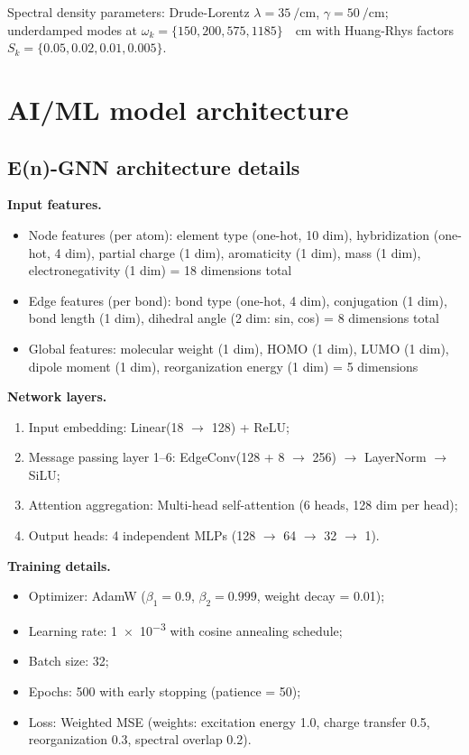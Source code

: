 \documentclass[11pt,a4paper]{article}
\begin{document}
Spectral density parameters: Drude-Lorentz $\lambda = \SI{35}{\per\centi\meter}$, $\gamma = \SI{50}{\per\centi\meter}$; underdamped modes at $\omega_k = \{\num{150}, \num{200}, \num{575}, \num{1185}\}$~\si{\per\centi\meter} with Huang-Rhys factors $S_k = \{\num{0.05}, \num{0.02}, \num{0.01}, \num{0.005}\}$.

\section{AI/ML model architecture}\label{si:ml_architecture}

\subsection{E(n)-GNN architecture details}

\textbf{Input features.}
\begin{itemize}
    \item Node features (per atom): element type (one-hot, 10 dim), hybridization (one-hot, 4 dim), partial charge (1 dim), aromaticity (1 dim), mass (1 dim), electronegativity (1 dim) = 18 dimensions total
    \item Edge features (per bond): bond type (one-hot, 4 dim), conjugation (1 dim), bond length (1 dim), dihedral angle (2 dim: sin, cos) = 8 dimensions total
    \item Global features: molecular weight (1 dim), HOMO (1 dim), LUMO (1 dim), dipole moment (1 dim), reorganization energy (1 dim) = 5 dimensions
\end{itemize}

\textbf{Network layers.}
\begin{enumerate}
    \item Input embedding: Linear(18 $\to$ 128) + ReLU;
    \item Message passing layer 1--6: EdgeConv(128 + 8 $\to$ 256) $\to$ LayerNorm $\to$ SiLU;
    \item Attention aggregation: Multi-head self-attention (6 heads, 128 dim per head);
    \item Output heads: 4 independent MLPs (128 $\to$ 64 $\to$ 32 $\to$ 1).
\end{enumerate}

\textbf{Training details.}
\begin{itemize}
    \item Optimizer: AdamW ($\beta_1 = 0.9$, $\beta_2 = \num{0.999}$, weight decay = \num{0.01});
    \item Learning rate: \num{1e-3} with cosine annealing schedule;
    \item Batch size: 32;
    \item Epochs: 500 with early stopping (patience = 50);
    \item Loss: Weighted MSE (weights: excitation energy 1.0, charge transfer 0.5, reorganization 0.3, spectral overlap 0.2).
\end{itemize}
\end{document}
